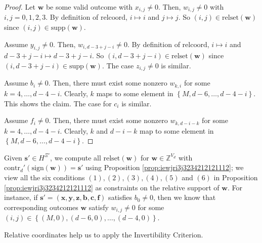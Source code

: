 \begin{proof}
    Let \( \mathbf{w} \) be some valid outcome with \( x_{i,j} \neq 0 \). Then, \( w_{i,j} \neq 0 \) with \( i,j = 0, 1,2, 3 \). By definition of \( \mathrm{relcoord} \), \( i \mapsto i \) and \( j \mapsto j \). So \( (i,j) \in \mathrm{relset}(\mathbf{w}) \) since \( (i,j) \in \mathrm{supp}(\mathbf{w}) \).

    Assume \( y_{i,j} \neq 0 \). Then, \( w_{i, d-3+j-i} \neq 0 \). By definition of \( \mathrm{relcoord} \), \( i \mapsto i \) and \( d-3+j-i \mapsto d-3+j-i \). So \( (i,d-3+j-i) \in \mathrm{relset}(\mathbf{w}) \) since \( (i,d-3+j-i) \in \mathrm{supp}(\mathbf{w}) \). The case \( z_{i,j} \neq 0 \) is similar.

    Assume \( b_{i} \neq 0 \). Then, there must exist some nonzero \( w_{k, i} \) for some \( k = 4, \dots, d-4-i \). Clearly, \( k \) maps to some element in \( \left\{ M, d-6, \dots, d-4-i \right\} \). This shows the claim. The case for \( c_i \) is similar.

    Assume \( f_{i} \neq 0 \). Then, there must exist some nonzero \( w_{k, d-i-k} \) for some \( k = 4, \dots, d-4-i \). Clearly, \( k \) and \( d-i-k \)  map to some element in \( \left\{ M, d-6, \dots, d-4-i \right\} \).
\end{proof}

\begin{remark}
    Given \( \mathbf{s}' \in {H}^{\Xi'} \), we compute all \( \mathrm{relset}(\mathbf{w}) \) for \( \mathbf{w} \in \mathbb{Z}^{V_d} \) with \( \mathrm{contr}_d'(\mathrm{sign}(\mathbf{w})) = \mathbf{s}'\) using Proposition \ref{prop:iewjri3j3234212121112}; we view all the six conditions \( (1), (2), (3), (4), (5) \) and \( (6) \) in Proposition \ref{prop:iewjri3j3234212121112} as constraints on the relative support of \( \mathbf{w} \). For instance, if \( \mathbf{s}' = (\mathbf{x},\mathbf{y},\mathbf{z},\mathbf{b},\mathbf{c},\mathbf{f} ) \) satisfies \( b_0 \neq 0 \), then we know that corresponding outcomes \( \mathbf{w} \) satisfy \( w_{i,j} \neq 0 \) for some  \( (i,j) \in \left\{ (M,0), (d-6, 0), \dots, (d-4, 0) \right\} \).
\end{remark}

Relative coordinates help us to apply the Invertibility Criterion. 


